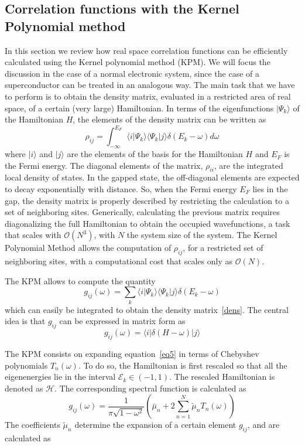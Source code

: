 \subsection{Correlation functions with the Kernel Polynomial method}
\label{sec:KPM}
In this section we review how real space correlation functions can be
efficiently calculated using the Kernel polynomial method
(KPM).\cite{Weisse2006}
We will focus the discussion in the case of a normal electronic system,
since the case of a superconductor can be treated in an analogous way.
The main task that we have to perform is to obtain the density matrix, evaluated
in a restricted area of real space, of a certain (very large) Hamiltonian. In
terms of the eigenfunctions $|\Psi_k\rangle$ of the Hamiltonian $H$,
the elements of the density
matrix can be written as
\begin{equation}
\rho_{ij} = \int_{-\infty}^{E_F} \langle i | \Psi_k \rangle \langle \Psi_k | j\rangle\delta(E_k -\omega) d\omega
\label{dens}
\end{equation}
where $|i\rangle$ and $|j\rangle$ are the elements of the basis for the
Hamiltonian $H$ and $E_F$ is the Fermi energy.
The diagonal elements of the matrix, $\rho_{ii}$, are the integrated local
density of
states.
In the gapped state, the off-diagonal elements are expected to decay
exponentially with distance. So, when the Fermi energy $E_F$ lies in the gap,
the density matrix is properly described by restricting the calculation to a set
of neighboring sites.
Generically, calculating the previous matrix requires diagonalizing the full
Hamiltonian to obtain the occupied wavefunctions, a task that scales with
$\mathcal{O}(N^3)$, with $N$ the system size of the system.
The Kernel Polynomial Method allows the computation of $\rho_{ij}$, for a
restricted set of neighboring sites, with a computational cost that scales only
as $\mathcal{O}(N)$.

The KPM allows to compute the quantity
\begin{equation}
g_{ij}(\omega) = \sum_k \langle i | \Psi_k \rangle \langle \Psi_k | j\rangle\delta(E_k -\omega)
\end{equation}
which can easily be integrated to obtain the density matrix~\eqref{dens}. The
central idea is that $g_{ij}$ can be expressed in matrix form as
\begin{equation}
g_{ij}(\omega) =
\langle i | \delta (H-\omega) | j \rangle
\label{eq5}
\end{equation}

The KPM consists on expanding equation~\eqref{eq5} in terms of Chebyshev
polynomials $T_n(\omega)$. To do so, the Hamiltonian is first rescaled so that
all the eigenenergies lie in the interval $\mathcal{E}_k \in (-1,1)$. The
rescaled Hamiltonian is denoted as $\mathcal{H}$. The corresponding spectral
function is calculated as
\begin{equation}
g_{ij}({\omega}) = \frac{1}{\pi \sqrt{1-\omega^2}}
\left (\bar \mu_n + 2 \sum^N_{n=1} \tilde \mu_n T_n (\omega)
\right )
\label{KPM}
\end{equation}
The coefficients $\tilde \mu_n$ determine the expansion of a certain element
$g_{ij}$, and are calculated as


